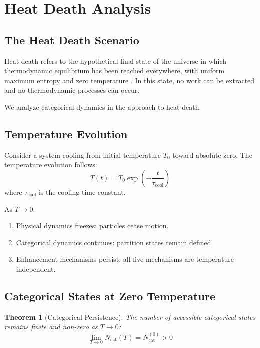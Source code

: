\documentclass[twocolumn,10pt]{article}
\newtheorem{theorem}{Theorem}[section]
\begin{document}
\section{Heat Death Analysis}
\label{sec:heatdeath}

\subsection{The Heat Death Scenario}

Heat death refers to the hypothetical final state of the universe in which thermodynamic equilibrium has been reached everywhere, with uniform maximum entropy and zero temperature \cite{helmholtz1854,kelvin1852}. In this state, no work can be extracted and no thermodynamic processes can occur.

We analyze categorical dynamics in the approach to heat death.

\subsection{Temperature Evolution}

Consider a system cooling from initial temperature $T_0$ toward absolute zero. The temperature evolution follows:
\begin{equation}
    T(t) = T_0 \exp\left(-\frac{t}{\tau_{\text{cool}}}\right)
\end{equation}
where $\tau_{\text{cool}}$ is the cooling time constant.

As $T \to 0$:
\begin{enumerate}
    \item Physical dynamics freezes: particles cease motion.
    \item Categorical dynamics continues: partition states remain defined.
    \item Enhancement mechanisms persist: all five mechanisms are temperature-independent.
\end{enumerate}

\subsection{Categorical States at Zero Temperature}

\begin{theorem}[Categorical Persistence]
The number of accessible categorical states remains finite and non-zero as $T \to 0$:
\begin{equation}
    \lim_{T \to 0} N_{\text{cat}}(T) = N_{\text{cat}}^{(0)} > 0
\end{equation}
\end{theorem}
\end{document}
